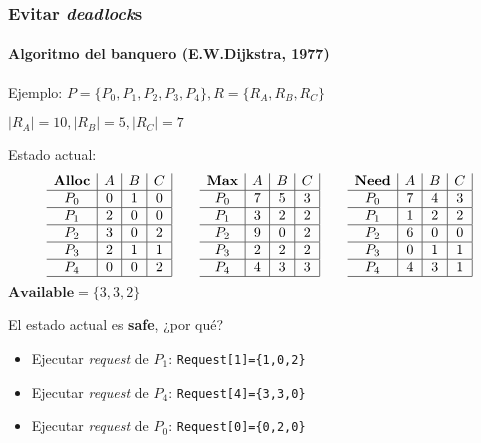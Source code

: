 \documentclass[letter]{beamer}
\begin{document}
\begin{frame}
  \frametitle{Evitar {\em deadlock}s}
  \framesubtitle{Algoritmo del banquero (E.W.Dijkstra, 1977)}

  Ejemplo: $P=\{P_0,P_1,P_2,P_3,P_4\}, R=\{R_A,R_B,R_C\}$
  
  $|R_A|=10, |R_B|=5, |R_C|=7$
  
  Estado actual:
  \[
  \begin{array}{c|c|c|c|}
   \textbf{Alloc} & A & B & C \\ \hline
   P_0 & 0 & 1 & 0 \\ \hline
   P_1 & 2 & 0 & 0 \\ \hline
   P_2 & 3 & 0 & 2 \\ \hline
   P_3 & 2 & 1 & 1 \\ \hline
   P_4 & 0 & 0 & 2 \\ \hline
  \end{array}
  \qquad 
  \begin{array}{c|c|c|c|}
   \textbf{Max} & A & B & C \\ \hline
   P_0 & 7 & 5 & 3 \\ \hline
   P_1 & 3 & 2 & 2 \\ \hline
   P_2 & 9 & 0 & 2 \\ \hline
   P_3 & 2 & 2 & 2 \\ \hline
   P_4 & 4 & 3 & 3 \\ \hline
  \end{array}
  \qquad
   \begin{array}{c|c|c|c|}
   \textbf{Need} & A & B & C \\ \hline
   P_0 & 7 & 4 & 3 \\ \hline
   P_1 & 1 & 2 & 2 \\ \hline
   P_2 & 6 & 0 & 0 \\ \hline
   P_3 & 0 & 1 & 1 \\ \hline
   P_4 & 4 & 3 & 1 \\ \hline
  \end{array}
  \]
  $\textbf{Available}=\{3,3,2\}$
  
  El estado actual es {\bf safe}, ¿por qué? 
  
  \begin{itemize}
    \item<3-> Ejecutar {\em request} de $P_1$: {\tt Request[1]=\{1,0,2\}}
    \item<3-> Ejecutar {\em request} de $P_4$: {\tt Request[4]=\{3,3,0\}}
    \item<3-> Ejecutar {\em request} de $P_0$: {\tt Request[0]=\{0,2,0\}}
  \end{itemize}
\end{frame}
\end{document}

